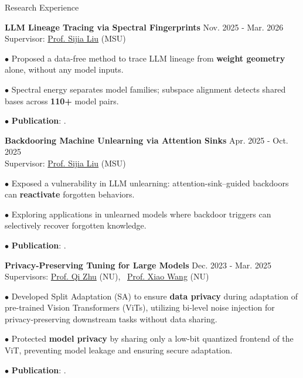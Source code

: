 
\begin{rSection}{Research Experience}
    
     \small{{\bf LLM Lineage Tracing via Spectral Fingerprints}  \hfill Nov. 2025 - Mar. 2026
    \\ Supervisor: \href{https://lsjxjtu.github.io/index.html}{\textcolor{BS_color}{Prof. Sijia Liu}} (MSU)
\vspace{-1.5mm}
    
    \quad $\bullet$ Proposed a data-free method to trace LLM lineage from \textbf{weight geometry} alone, without any model inputs.
\vspace{-2mm}
    
    \quad $\bullet$ Spectral energy separates model families; subspace alignment detects shared bases across \textbf{110+} model pairs.
\vspace{-2mm}

    \quad $\bullet$ \textbf{Publication}: .
    }
    
     \small{{\bf Backdooring Machine Unlearning via Attention Sinks}  \hfill Apr. 2025 - Oct. 2025
    \\ Supervisor: \href{https://lsjxjtu.github.io/index.html}{\textcolor{BS_color}{Prof. Sijia Liu}} (MSU)
\vspace{-1.5mm}
    
    \quad $\bullet$ Exposed a vulnerability in LLM unlearning: attention-sink–guided backdoors can \textbf{reactivate} forgotten behaviors.
\vspace{-2mm}
    
    \quad $\bullet$ Exploring applications in unlearned models where backdoor triggers can selectively recover forgotten knowledge.

    \quad $\bullet$ \textbf{Publication}: .
    

    }
    
    \small{{\bf Privacy-Preserving Tuning for Large Models}  \hfill Dec. 2023 - Mar. 2025
    \\  Supervisors: \href{https://scholar.google.com/citations?user=TN09YMcAAAAJ&hl=en}{\textcolor{BS_color}{Prof. Qi Zhu}} (NU), \ \href{https://wangxiao1254.github.io/}{\textcolor{BS_color}{Prof. Xiao Wang}} (NU)
\vspace{-1.5mm}
    
    
    \quad $\bullet$ Developed Split Adaptation (SA) to ensure \textbf{data privacy }during adaptation of pre-trained Vision Transformers
(ViTs), utilizing bi-level noise injection for privacy-preserving downstream tasks without data sharing.
\vspace{-2mm}

    \quad $\bullet$ Protected \textbf{model privacy} by sharing only a low-bit quantized frontend of the ViT, preventing model leakage and
ensuring secure adaptation.
\vspace{-2mm}

    \quad $\bullet$ \textbf{Publication}: .


}

\vspace*{-2mm}

    \end{rSection}
